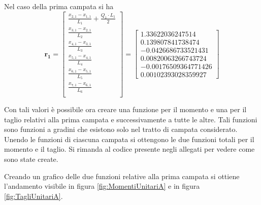 Nel caso della prima campata si ha
\begin{equation}
\mathbf{r_1}=
\begin{bmatrix}
\frac{x_{2,1}-x_{1,1}}{L_1}+\frac{Q_1\cdot L_1}{2} \\
\frac{x_{3,1}-x_{2,1}}{L_2} \\
\frac{x_{4,1}-x_{3,1}}{L_3} \\
\frac{x_{5,1}-x_{4,1}}{L_4} \\
\frac{x_{6,1}-x_{5,1}}{L_5} \\
\frac{x_{7,1}-x_{6,1}}{L_6} \\
\end{bmatrix} =
\begin{bmatrix}
1.33622036247514 \\
0.139807841738474 \\
-0.0426686733521431 \\
0.00820063266743724 \\
-0.00176509364771426 \\
0.00102393028359927
\end{bmatrix}
\end{equation}

Con tali valori è possibile ora creare una funzione per il momento e una per il taglio relativi alla prima campata e successivamente a tutte le altre.
Tali funzioni sono funzioni a gradini che esistono solo nel tratto di campata considerato.
Unendo le funzioni di ciascuna campata si ottengono le due funzioni totali per il momento e il taglio.
Si rimanda al codice presente negli allegati per vedere come sono state create.

Creando un grafico delle due funzioni relative alla prima campata si ottiene l'andamento visibile in figura \ref{fig:MomentiUnitariA} e in figura \ref{fig:TagliUnitariA}.

